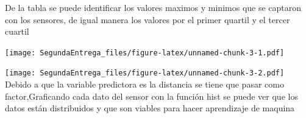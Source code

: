 \documentclass[
]{article}
\newenvironment{Shaded}{\begin{snugshade}}{\end{snugshade}}
\newcommand{\AttributeTok}[1]{\textcolor[rgb]{0.77,0.63,0.00}{#1}}
\newcommand{\DecValTok}[1]{\textcolor[rgb]{0.00,0.00,0.81}{#1}}
\newcommand{\FunctionTok}[1]{\textcolor[rgb]{0.00,0.00,0.00}{#1}}
\newcommand{\NormalTok}[1]{#1}
\newcommand{\OtherTok}[1]{\textcolor[rgb]{0.56,0.35,0.01}{#1}}
\newcommand{\SpecialCharTok}[1]{\textcolor[rgb]{0.00,0.00,0.00}{#1}}
\newcommand{\StringTok}[1]{\textcolor[rgb]{0.31,0.60,0.02}{#1}}
\begin{document}
De la tabla se puede identificar los valores maximos y minimos que se
captaron con los sensores, de igual manera los valores por el primer
quartil y el tercer cuartil

\begin{Shaded}
\end{Shaded}

\texttt{[image: SegundaEntrega\_files/figure-latex/unnamed-chunk-3-1.pdf]}

\begin{Shaded}
\end{Shaded}

\texttt{[image: SegundaEntrega\_files/figure-latex/unnamed-chunk-3-2.pdf]}
Debido a que la variable predictora es la distancia se tiene que pasar
como factor,Graficando cada dato del sensor con la función hist se puede
ver que los datos están distribuidos y que son viables para hacer
aprendizaje de maquina

\begin{Shaded}
\end{Shaded}
\end{document}
